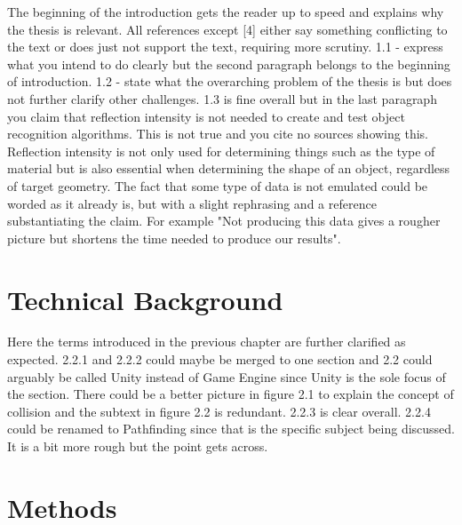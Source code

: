 \documentclass[12pt,a4paper,twoside,openright]{report}
\begin{document}
	The beginning of the introduction gets the reader up to speed and explains
	why the thesis is relevant. All references except [4] either say something
	conflicting to the text or does just not support the text, requiring more 
	scrutiny. 1.1 - express what you intend to do clearly but the second 
	paragraph belongs to the beginning of introduction. 1.2 - state what the
	overarching problem of the thesis is but does not further clarify other
	challenges. 1.3 is fine overall but in the last paragraph you claim that
	reflection intensity is not needed	to create and test object recognition
	algorithms. This is not true and you cite no sources showing this.
	Reflection intensity is not only used for determining things such as the
	type of material but is also essential when determining the shape of an
	object, regardless of target geometry. The fact that some type of data is
	not emulated could be worded as it already is, but with a slight rephrasing
	and a reference substantiating the claim. For example "Not producing this
	data gives a rougher picture but shortens the time needed to produce our
	results".

\section*{Technical Background}

	Here the terms introduced in the previous chapter are further clarified as
	expected. 2.2.1 and 2.2.2 could maybe be merged to one section and 2.2
	could arguably be called Unity instead of Game Engine since Unity is the
	sole focus of the section. There could be a better picture in figure 2.1 to
	explain the concept of collision and the subtext in figure 2.2 is
	redundant. 2.2.3 is clear overall. 2.2.4 could be renamed to Pathfinding
	since that is the specific subject being discussed. It is a bit more rough
	but the point gets across.

\section*{Methods}
\end{document}

